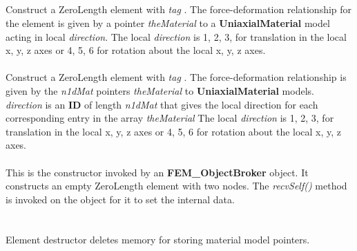  \\
 \\
    


  \\
 \\
Construct a ZeroLength element with {\em tag} .
The force-deformation relationship for the element is given by a pointer {\em theMaterial} to a
{\bf UniaxialMaterial} model acting in local {\em direction}.
The local {\em direction} is 1, 2, 3, for translation in the local x, y, z axes or 4, 5, 6 
for rotation about the local x, y, z axes. 
\\

 \\
Construct a ZeroLength element with {\em tag} .
The force-deformation relationship is given by the {\em n1dMat} pointers
{\em theMaterial} to {\bf UniaxialMaterial} models. 
{\em direction} is an {\bf ID}  of length {\em n1dMat} that gives
the local direction for each corresponding entry in the array {\em theMaterial}
The local {\em direction} is 1, 2, 3, for translation in the local x, y, z axes or 4, 5, 6 
for rotation about the local x, y, z axes. 
\\

 \\ 
This is the constructor invoked by an {\bf FEM\_ObjectBroker} object. It
constructs an empty ZeroLength element with two nodes.
The {\em recvSelf()} method is
invoked on the object for it to set the internal data. 
\\

 \\
 \\ 
Element destructor deletes memory for storing material model pointers. 
\\

